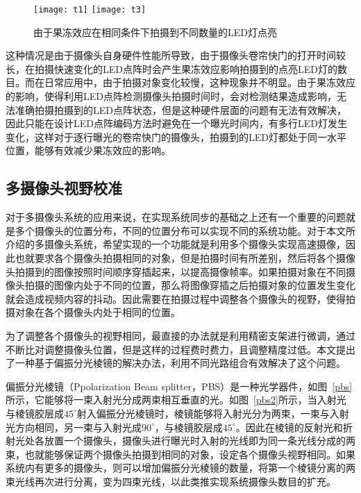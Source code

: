 \begin{figure}[h]
  \centering%
    {\texttt{[image: t1]}}
      {\texttt{[image: t3]}}
  \caption{由于果冻效应在相同条件下拍摄到不同数量的LED灯点亮}
  \label{t}
\end{figure}

这种情况是由于摄像头自身硬件性能所导致，由于摄像头卷帘快门的打开时间较长，在拍摄快速变化的LED点阵时会产生果冻效应影响拍摄到的点亮LED灯的数目。而在日常应用中，由于拍摄对象变化较慢，这种现象并不明显。由于果冻效应的影响，使得利用LED点阵检测摄像头拍摄时间时，会对检测结果造成影响，无法准确拍摄拍摄到的LED点阵状态，但是这种硬件层面的问题有无法有效解决，因此只能在设计LED点阵编码方法时避免在一个曝光时间内，有多行LED灯发生变化，这样对于逐行曝光的卷帘快门的摄像头，拍摄到的LED灯都处于同一水平位置，能够有效减少果冻效应的影响。

\subsection{多摄像头视野校准}

对于多摄像头系统的应用来说，在实现系统同步的基础之上还有一个重要的问题就是多个摄像头的位置分布，不同的位置分布可以实现不同的系统功能。对于本文所介绍的多摄像头系统，希望实现的一个功能就是利用多个摄像头实现高速摄像，因此也就要求各个摄像头拍摄相同的对象，但是拍摄时间有所差别，然后将各个摄像头拍摄到的图像按照时间顺序穿插起来，以提高摄像帧率。如果拍摄对象在不同摄像头拍摄的图像内处于不同的位置，那么将图像穿插之后拍摄对象的位置发生变化就会造成视频内容的抖动。因此需要在拍摄过程中调整各个摄像头的视野，使得拍摄对象在各个摄像头内处于相同的位置。

为了调整各个摄像头的视野相同，最直接的办法就是利用精密支架进行微调，通过不断比对调整摄像头位置，但是这样的过程费时费力，且调整精度过低。本文提出了一种基于偏振分光棱镜的解决办法，利用不同光路组合有效解决了这个问题。

偏振分光棱镜（Ppolarization Beam splitter，PBS）是一种光学器件，如图~\ref{pbs}所示，它能够将一束入射光分成两束相互垂直的光。如图~\ref{pbs2}所示，当入射光与棱镜胶层成$45^{\circ}$射入偏振分光棱镜时，棱镜能够将入射光分为两束，一束与入射光方向相同，另一束与入射光成$90^{\circ}$，与棱镜胶层成$45^{\circ}$。因此在棱镜的反射光和折射光处各放置一个摄像头，摄像头进行曝光时入射的光线即为同一条光线分成的两束，也就能够保证两个摄像头拍摄到相同的对象，设定各个摄像头视野相同。如果系统内有更多的摄像头，则可以增加偏振分光棱镜的数量，将第一个棱镜分离的两束光线再次进行分离，变为四束光线，以此类推实现系统摄像头数目的扩充。


